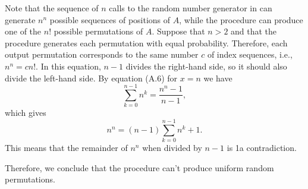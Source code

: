 Note that the sequence of $n$ calls to the random number generator in  can generate $n^n$ possible sequences of positions of $A$, while the procedure can produce one of the $n!$ possible permutations of $A$.
Suppose that $n>2$ and that the procedure generates each permutation with equal probability.
Therefore, each output permutation corresponds to the same number $c$ of index sequences, i.e., $n^n=cn!$.
In this equation, $n-1$ divides the right-hand side, so it should also divide the left-hand side.
By equation (A.6) for $x=n$ we have
\[
    \sum_{k=0}^{n-1}n^k = \frac{n^n-1}{n-1},
\]
which gives
\[
    n^n = (n-1)\sum_{k=0}^{n-1}n^k+1.
\]
This means that the remainder of $n^n$ when divided by $n-1$ is 1\dash a contradiction.

Therefore, we conclude that the procedure  can't produce uniform random permutations.
